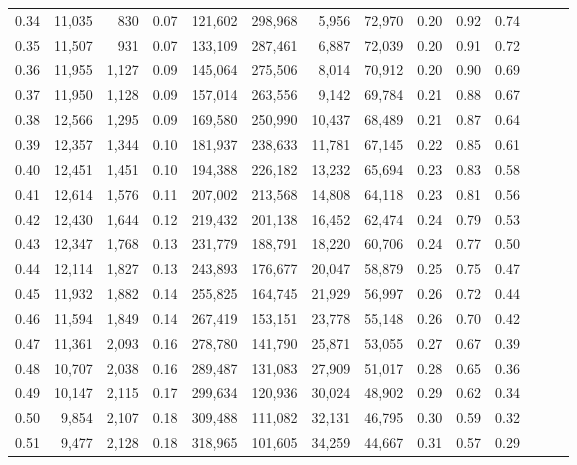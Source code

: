 \begin{tabular}{rrrrrrrrrrrrrr}
0.34 &  11,035 &    830 &  0.07 &  121,602 &  298,968 &   5,956 &  72,970 &  0.20 &  0.92 &      0.74 \\
0.35 &  11,507 &    931 &  0.07 &  133,109 &  287,461 &   6,887 &  72,039 &  0.20 &  0.91 &      0.72 \\
0.36 &  11,955 &  1,127 &  0.09 &  145,064 &  275,506 &   8,014 &  70,912 &  0.20 &  0.90 &      0.69 \\
0.37 &  11,950 &  1,128 &  0.09 &  157,014 &  263,556 &   9,142 &  69,784 &  0.21 &  0.88 &      0.67 \\
0.38 &  12,566 &  1,295 &  0.09 &  169,580 &  250,990 &  10,437 &  68,489 &  0.21 &  0.87 &      0.64 \\
0.39 &  12,357 &  1,344 &  0.10 &  181,937 &  238,633 &  11,781 &  67,145 &  0.22 &  0.85 &      0.61 \\
0.40 &  12,451 &  1,451 &  0.10 &  194,388 &  226,182 &  13,232 &  65,694 &  0.23 &  0.83 &      0.58 \\
0.41 &  12,614 &  1,576 &  0.11 &  207,002 &  213,568 &  14,808 &  64,118 &  0.23 &  0.81 &      0.56 \\
0.42 &  12,430 &  1,644 &  0.12 &  219,432 &  201,138 &  16,452 &  62,474 &  0.24 &  0.79 &      0.53 \\
0.43 &  12,347 &  1,768 &  0.13 &  231,779 &  188,791 &  18,220 &  60,706 &  0.24 &  0.77 &      0.50 \\
0.44 &  12,114 &  1,827 &  0.13 &  243,893 &  176,677 &  20,047 &  58,879 &  0.25 &  0.75 &      0.47 \\
0.45 &  11,932 &  1,882 &  0.14 &  255,825 &  164,745 &  21,929 &  56,997 &  0.26 &  0.72 &      0.44 \\
0.46 &  11,594 &  1,849 &  0.14 &  267,419 &  153,151 &  23,778 &  55,148 &  0.26 &  0.70 &      0.42 \\
0.47 &  11,361 &  2,093 &  0.16 &  278,780 &  141,790 &  25,871 &  53,055 &  0.27 &  0.67 &      0.39 \\
0.48 &  10,707 &  2,038 &  0.16 &  289,487 &  131,083 &  27,909 &  51,017 &  0.28 &  0.65 &      0.36 \\
0.49 &  10,147 &  2,115 &  0.17 &  299,634 &  120,936 &  30,024 &  48,902 &  0.29 &  0.62 &      0.34 \\
0.50 &   9,854 &  2,107 &  0.18 &  309,488 &  111,082 &  32,131 &  46,795 &  0.30 &  0.59 &      0.32 \\
0.51 &   9,477 &  2,128 &  0.18 &  318,965 &  101,605 &  34,259 &  44,667 &  0.31 &  0.57 &      0.29 \\

\end{tabular}

